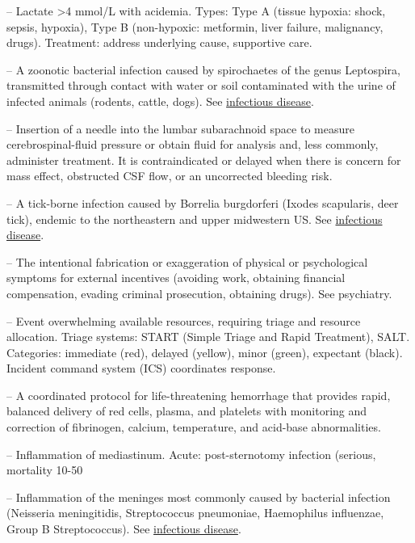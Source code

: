 -- Lactate >4 mmol/L with acidemia. Types: Type A (tissue hypoxia: shock, sepsis, hypoxia), Type B (non-hypoxic: metformin, liver failure, malignancy, drugs). Treatment: address underlying cause, supportive care.

-- A zoonotic bacterial infection caused by spirochaetes of the genus Leptospira, transmitted through contact with water or soil contaminated with the urine of infected animals (rodents, cattle, dogs). See \hyperlink{Infectious Disease}{infectious disease}.

-- Insertion of a needle into the lumbar subarachnoid space to measure cerebrospinal-fluid pressure or obtain fluid for analysis and, less commonly, administer treatment. It is contraindicated or delayed when there is concern for mass effect, obstructed CSF flow, or an uncorrected bleeding risk.

-- A tick-borne infection caused by Borrelia burgdorferi (Ixodes scapularis, deer tick), endemic to the northeastern and upper midwestern US. See \hyperlink{Infectious Disease}{infectious disease}.

-- The intentional fabrication or exaggeration of physical or psychological symptoms for external incentives (avoiding work, obtaining financial compensation, evading criminal prosecution, obtaining drugs). See psychiatry.

-- Event overwhelming available resources, requiring triage and resource allocation. Triage systems: START (Simple Triage and Rapid Treatment), SALT. Categories: immediate (red), delayed (yellow), minor (green), expectant (black). Incident command system (ICS) coordinates response.

-- A coordinated protocol for life-threatening hemorrhage that provides rapid, balanced delivery of red cells, plasma, and platelets with monitoring and correction of fibrinogen, calcium, temperature, and acid-base abnormalities.

-- Inflammation of mediastinum. Acute: post-sternotomy infection (serious, mortality 10-50%

-- Inflammation of the meninges most commonly caused by bacterial infection (Neisseria meningitidis, Streptococcus pneumoniae, Haemophilus influenzae, Group B Streptococcus). See \hyperlink{Infectious Disease}{infectious disease}.

